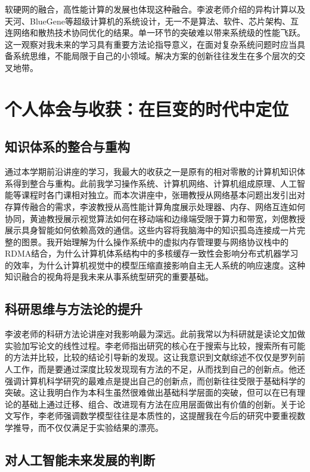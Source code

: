 \documentclass[zihao=-4, linespread=1.5]{ctexart}
\begin{document}
软硬网的融合，高性能计算的发展也体现这种融合。李波老师介绍的异构计算以及天河、BlueGene等超级计算机的系统设计，无一不是算法、软件、芯片架构、互连网络和散热技术协同优化的结果。单一环节的突破难以带来系统级的性能飞跃。这一观察对我未来的学习具有重要方法论指导意义，在面对复杂系统问题时应当具备系统思维，不能局限于自己的小领域。解决方案的创新往往发生在多个层次的交叉地带。

\section{个人体会与收获：在巨变的时代中定位}

\subsection{知识体系的整合与重构}

通过本学期前沿讲座的学习，我最大的收获之一是原有的相对零散的计算机知识体系得到整合与重构。此前我学习操作系统、计算机网络、计算机组成原理、人工智能等课程时各门课相对独立。而本次讲座中，张珊教授从网络基本问题出发引出对存算传融合的需求，李波教授从高性能计算角度展示处理器、内存、网络互连如何协同，黄迪教授展示视觉算法如何在移动端和边缘端受限于算力和带宽，刘偲教授展示具身智能如何依赖高效的通信。这些内容将我脑海中的知识孤岛连接成一片完整的图景。我开始理解为什么操作系统中的虚拟内存管理要与网络协议栈中的RDMA结合，为什么计算机体系结构中的多核缓存一致性会影响分布式机器学习的效率，为什么计算机视觉中的模型压缩直接影响自主无人系统的响应速度。这种知识融合的视角将是我未来从事系统型研究的重要基础。

\subsection{科研思维与方法论的提升}

李波老师的科研方法论讲座对我影响最为深远。此前我常以为科研就是读论文加做实验加写论文的线性过程。李老师指出研究的核心在于搜索与比较，搜索所有可能的方法并比较，比较的结论引导新的发现。这让我意识到文献综述不仅仅是罗列前人工作，而是要通过深度比较发现现有方法的不足，从而找到自己的创新点。他还强调计算机科学研究的最难点是提出自己的创新点，而创新往往受限于基础科学的突破。这让我明白作为本科生虽然很难做出基础科学层面的突破，但可以在已有理论的基础上通过迁移、组合、改进现有方法在应用层面做出有价值的创新。关于论文写作，李老师强调数学模型往往是本质性的，这提醒我在今后的研究中要重视数学推导，而不仅仅满足于实验结果的漂亮。

\subsection{对人工智能未来发展的判断}
\end{document}
